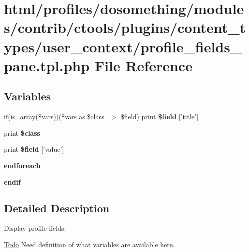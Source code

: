 \hypertarget{profile__fields__pane_8tpl_8php}{
\section{html/profiles/dosomething/modules/contrib/ctools/plugins/content\_\-types/user\_\-context/profile\_\-fields\_\-pane.tpl.php File Reference}
\label{profile__fields__pane_8tpl_8php}
}
\subsection*{Variables}
\begin{DoxyCompactItemize}
\item 
\hypertarget{profile__fields__pane_8tpl_8php_a5e66847a512328bcc5a9632ca75d3550}{
if(is\_\-array(\$vars))(\$vars as \$class=$>$ \$field) print {\bfseries \$field} \mbox{[}'title'\mbox{]}}
\label{profile__fields__pane_8tpl_8php_a5e66847a512328bcc5a9632ca75d3550}

\item 
\hypertarget{profile__fields__pane_8tpl_8php_a37ff9172f25a6ba53d6e3509c4934849}{
print {\bfseries \$class}}
\label{profile__fields__pane_8tpl_8php_a37ff9172f25a6ba53d6e3509c4934849}

\item 
\hypertarget{profile__fields__pane_8tpl_8php_a2ff201e8a0185ef0145c510b57ead182}{
print {\bfseries \$field} \mbox{[}'value'\mbox{]}}
\label{profile__fields__pane_8tpl_8php_a2ff201e8a0185ef0145c510b57ead182}

\item 
\hypertarget{profile__fields__pane_8tpl_8php_a672d9707ef91db026c210f98cc601123}{
{\bfseries endforeach}}
\label{profile__fields__pane_8tpl_8php_a672d9707ef91db026c210f98cc601123}

\item 
\hypertarget{profile__fields__pane_8tpl_8php_a82cd33ca97ff99f2fcc5e9c81d65251b}{
{\bfseries endif}}
\label{profile__fields__pane_8tpl_8php_a82cd33ca97ff99f2fcc5e9c81d65251b}

\end{DoxyCompactItemize}


\subsection{Detailed Description}
Display profile fields.

\begin{Desc}
\item[\hyperlink{todo__todo000016}{Todo}]Need definition of what variables are available here. \end{Desc}
